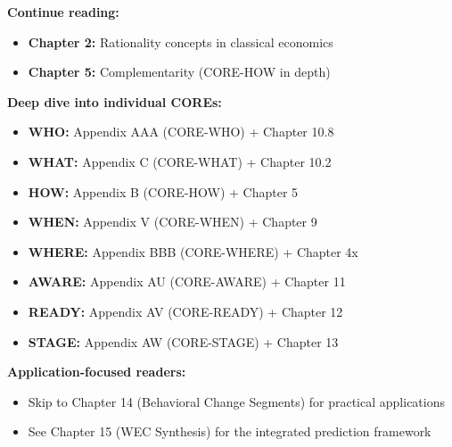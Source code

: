 \begin{tcolorbox}[colback=green!5!white, colframe=green!75!black,
    title=\textbf{Reading Paths from Chapter 1b}]
\small

\textbf{Continue reading:}
\begin{itemize}[nosep]
    \item \textbf{Chapter 2:} Rationality concepts in classical economics
    \item \textbf{Chapter 5:} Complementarity (CORE-HOW in depth)
\end{itemize}

\medskip
\textbf{Deep dive into individual COREs:}
\begin{itemize}[nosep]
    \item \textbf{WHO:} Appendix AAA (CORE-WHO) + Chapter 10.8
    \item \textbf{WHAT:} Appendix C (CORE-WHAT) + Chapter 10.2
    \item \textbf{HOW:} Appendix B (CORE-HOW) + Chapter 5
    \item \textbf{WHEN:} Appendix V (CORE-WHEN) + Chapter 9
    \item \textbf{WHERE:} Appendix BBB (CORE-WHERE) + Chapter 4x
    \item \textbf{AWARE:} Appendix AU (CORE-AWARE) + Chapter 11
    \item \textbf{READY:} Appendix AV (CORE-READY) + Chapter 12
    \item \textbf{STAGE:} Appendix AW (CORE-STAGE) + Chapter 13
\end{itemize}

\medskip
\textbf{Application-focused readers:}
\begin{itemize}[nosep]
    \item Skip to Chapter 14 (Behavioral Change Segments) for practical applications
    \item See Chapter 15 (WEC Synthesis) for the integrated prediction framework
\end{itemize}
\end{tcolorbox}

